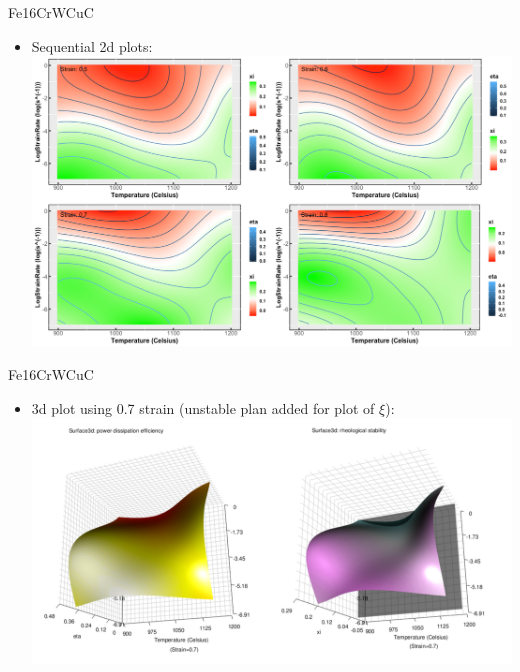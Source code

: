 \documentclass[11pt]{beamer}
\begin{document}
\begin{frame}[t]{Fe{\color{red}16Cr}WCuC}
	\begin{minipage}[t]{1\textwidth}
        \vspace{0pt}
        \begin{itemize}
            \item {\small Sequential 2d plots:}
            \\
            \includegraphics[scale=0.45]{Fig11.png}
        \end{itemize}
    \end{minipage}%
\end{frame}

\begin{frame}[t]{Fe{\color{red}16Cr}WCuC}
	\begin{minipage}[t]{1\textwidth}
        \vspace{0pt}
        \begin{itemize}
            \item {\small 3d plot using 0.7 strain (unstable plan added for plot of $\xi$):}
            \\
            \includegraphics[scale=0.47]{Fig12.png}
        \end{itemize}
    \end{minipage}%
\end{frame}
\end{document}
